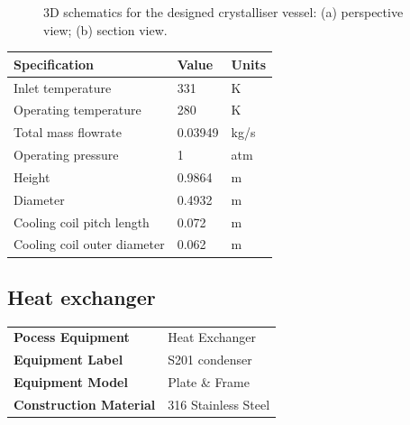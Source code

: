 \begin{figure}[H]
    \centering
    
    \caption{3D schematics for the designed crystalliser vessel: (a) perspective view; (b) section view.}
    \label{fig:schematic crystalliser process design data sheet}
\end{figure}

\begin{table}[H]
\centering
\begin{tabular}{@{}l|l|l@{}}
\toprule
\textbf{Specification}                  & \textbf{Value} & \textbf{Units}    \\ \midrule
Inlet temperature                       & 331             & K                \\ \midrule
Operating temperature                   & 280             & K                \\ \midrule
Total mass  flowrate                    & 0.03949         & kg/s             \\ \midrule
Operating pressure                      & 1               & atm               \\ \midrule
Height                                  & 0.9864          & m                 \\ \midrule
Diameter                                & 0.4932          & m                 \\ \midrule
Cooling coil pitch length               & 0.072           & m                 \\ \midrule
Cooling coil outer diameter             & 0.062           & m                  \\ \bottomrule
\end{tabular}
\end{table}

\newpage
\subsection{Heat exchanger}

\begin{table}[H]
    \centering
    \begin{tabular}{@{}l|l@{}}
    \toprule
    \textbf{Pocess Equipment}      & Heat Exchanger      \\
    \textbf{Equipment Label}       & S201 condenser      \\
    \textbf{Equipment Model}       & Plate   \& Frame    \\
    \textbf{Construction Material} & 316 Stainless Steel \\ \bottomrule
    \end{tabular}
\end{table}


